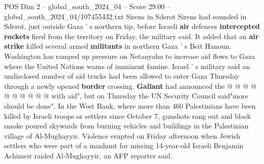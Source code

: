 \begin{textsample}{POS Dim 2 – global\_south\_2024\_04 – Score 29.00 – global\_south\_2024\_04/107455432.txt}
Sirens in Sderot Sirens had sounded in Sderot, just outside Gaza ' s northern tip, before Israeli \textbf{air} defences \textbf{intercepted} \textbf{rockets} fired from the territory on Friday, the military said.
It added that an \textbf{air} \textbf{strike} killed several armed \textbf{militants} in northern Gaza ' s Beit Hanoun.
Washington has ramped up pressure on Netanyahu to increase aid flows to Gaza where the United Nations warns of imminent famine.
Israel ' s military said an undisclosed number of aid trucks had been allowed to enter Gaza Thursday through a newly opened \textbf{border} crossing. \textbf{Gallant} had announced the @ @ @ @ @ @ @ @ @ @ with aid", but on Thursday the UN Security Council said"more should be done".
In the West Bank, where more than 460 Palestinians have been killed by Israeli troops or settlers since October 7, gunshots rang out and black smoke poured skywards from burning vehicles and buildings in the Palestinian village of Al-Mughayyir.
Violence erupted on Friday afternoon when Jewish settlers who were part of a manhunt for missing 14-year-old Israeli Benjamin Achimeir raided Al-Mughayyir, an AFP reporter said.

\end{textsample}
